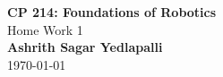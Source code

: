 \begin{titlepage}
    \centering
    \LARGE{\textbf{CP 214: Foundations of Robotics}} \\
    \Large{Home Work 1} \\
    \large{\textbf{Ashrith Sagar Yedlapalli}} \\
    \today
\end{titlepage}
